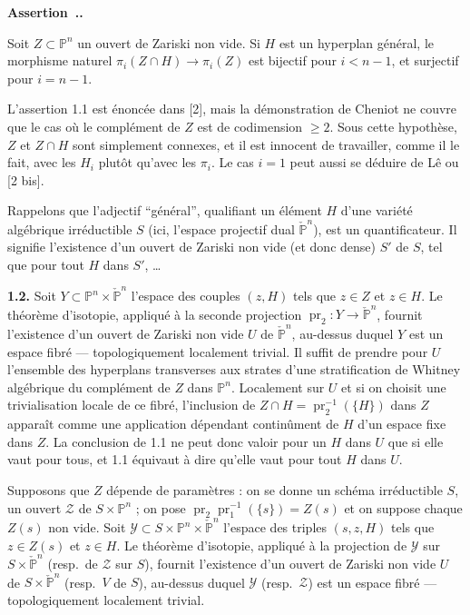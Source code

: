 \documentclass[12pt,a4paper]{article}
\newcounter{secitem}
\renewcommand{\thesecitem}{\thesection.\arabic{secitem}}
\newenvironment{secassertion}{%
  \refstepcounter{secitem}%
  \par\medskip\noindent\textbf{Assertion~\thesecitem.}~\ignorespaces
}{\par\medskip}
\DeclareMathOperator{\pr}{pr}
\begin{document}
\begin{secassertion}
Soit $Z \subset \mathbb{P}^n$ un ouvert de Zariski non vide. Si $H$ est un hyperplan général, le morphisme naturel $\pi_i(Z \cap H) \to \pi_i(Z)$ est bijectif pour $i < n-1$, et surjectif pour $i = n-1$.
\end{secassertion}

L'assertion 1.1 est énoncée dans [2], mais la démonstration de Cheniot ne couvre que le cas où le complément de $Z$ est de codimension $\geq 2$. Sous cette hypothèse, $Z$ et $Z \cap H$ sont simplement connexes, et il est innocent de travailler, comme il le fait, avec les $H_i$ plutôt qu'avec les $\pi_i$. Le cas $i = 1$ peut aussi se déduire de Lê ou [2 bis].

Rappelons que l'adjectif ``général'', qualifiant un élément $H$ d'une variété algébrique irréductible $S$ (ici, l'espace projectif dual $\check{\mathbb{P}}^n$), est un quantificateur. Il signifie l'existence d'un ouvert de Zariski non vide (et donc dense) $S'$ de $S$, tel que pour tout $H$ dans $S'$, \ldots

\textbf{1.2.} Soit $Y \subset \mathbb{P}^n \times \check{\mathbb{P}}^n$ l'espace des couples $(z, H)$ tels que $z \in Z$ et $z \in H$. Le théorème d'isotopie, appliqué à la seconde projection $\pr_2 : Y \to \check{\mathbb{P}}^n$, fournit l'existence d'un ouvert de Zariski non vide $U$ de $\check{\mathbb{P}}^n$, au-dessus duquel $Y$ est un espace fibré --- topologiquement localement trivial. Il suffit de prendre pour $U$ l'ensemble des hyperplans transverses aux strates d'une stratification de Whitney algébrique du complément de $Z$ dans $\mathbb{P}^n$. Localement sur $U$ et si on choisit une trivialisation locale de ce fibré, l'inclusion de $Z \cap H = \pr_2^{-1}(\{H\})$ dans $Z$ apparaît comme une application dépendant continûment de $H$ d'un espace fixe dans $Z$. La conclusion de 1.1 ne peut donc valoir pour un $H$ dans $U$ que si elle vaut pour tous, et 1.1 équivaut à dire qu'elle vaut pour tout $H$ dans $U$.

Supposons que $Z$ dépende de paramètres : on se donne un schéma irréductible $S$, un ouvert $\mathcal{Z}$ de $S \times \mathbb{P}^n$ ; on pose $\pr_2\pr_1^{-1}(\{s\}) = Z(s)$ et on suppose chaque $Z(s)$ non vide. Soit $\mathcal{Y} \subset S \times \mathbb{P}^n \times \check{\mathbb{P}}^n$ l'espace des triples $(s, z, H)$ tels que $z \in Z(s)$ et $z \in H$. Le théorème d'isotopie, appliqué à la projection de $\mathcal{Y}$ sur $S \times \check{\mathbb{P}}^n$ (resp.\ de $\mathcal{Z}$ sur $S$), fournit l'existence d'un ouvert de Zariski non vide $U$ de $S \times \check{\mathbb{P}}^n$ (resp.\ $V$ de $S$), au-dessus duquel $\mathcal{Y}$ (resp.\ $\mathcal{Z}$) est un espace fibré --- topologiquement localement trivial.
\end{document}
